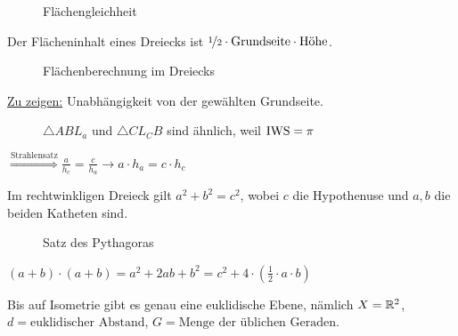 \begin{figure}[ht]
    \centering
    \label{fig:flaechengleichheit}
    \caption{Flächengleichheit}
\end{figure}

Der Flächeninhalt eines Dreiecks ist $\nicefrac{1}{2} \cdot \text{Grundseite} \cdot \text{Höhe}$.

\begin{figure}[htp]
    \centering
    
    \caption{Flächenberechnung im Dreiecks}
    \label{fig:flaechenberechnung-dreieck}
\end{figure}

\underline{Zu zeigen:} Unabhängigkeit von der gewählten Grundseite.

\begin{figure}[htp]
    \centering
    
    \caption{$\triangle ABL_a$ und $\triangle C{L_C}B$ sind ähnlich, weil $\operatorname{IWS} = \pi$}
    \label{fig:flaechenberechnung-dreieck-2}
\end{figure}

$\overset{\text{Strahlensatz}}{\Rightarrow} \frac{a}{h_c} = \frac{c}{h_a} \rightarrow a \cdot h_a = c \cdot h_c$

\begin{satz}
    Im rechtwinkligen Dreieck gilt $a^2 + b^2 = c^2$, wobei $c$ die
    Hypothenuse und $a, b$ die beiden Katheten sind.
\end{satz}

\begin{figure}[ht]
    \centering
    \subfloat[Beweisskizze]{
        
        \label{fig:bild-5}
    }%
    \label{fig:flaechengleichheit}
    \caption{Satz des Pythagoras}
\end{figure}

\begin{beweis}
    $(a+b) \cdot (a+b) = a^2 + 2ab + b^2 = c^2 +4 \cdot (\frac{1}{2} \cdot a \cdot b)$
\end{beweis}

\begin{satz}\label{satz:14.13} %
    Bis auf Isometrie gibt es genau eine euklidische Ebene, nämlich
    $X=\mathbb{R}^2$, $d = \text{euklidischer Abstand}$, $G = \text{Menge der üblichen Geraden}$.
\end{satz}


